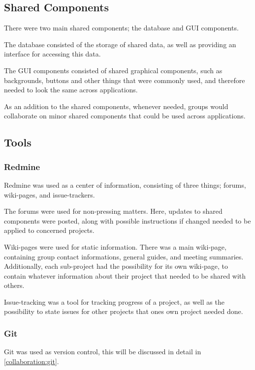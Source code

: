 \subsection{Shared Components}
There were two main shared components; the database and GUI components.

The database consisted of the storage of shared data, as well as providing an interface for accessing this data.

The GUI components consisted of shared graphical components, such as backgrounds, buttons and other things that were commonly used, and therefore needed to look the same across applications.

As an addition to the shared components, whenever needed, groups would collaborate on minor shared components that could be used across applications.

\subsection{Tools}

\subsubsection{Redmine}
Redmine was used as a center of information, consisting of three things; forums, wiki-pages, and issue-trackers.

The forums were used for non-pressing matters.
Here, updates to shared components were posted, along with possible instructions if changed needed to be applied to concerned projects.

Wiki-pages were used for static information.
There was a main wiki-page, containing group contact informations, general guides, and meeting summaries.
Additionally, each sub-project had the possibility for its own wiki-page, to contain whatever information about their project that needed to be shared with others.

Issue-tracking was a tool for tracking progress of a project, as well as the possibility to state issues for other projects that ones own project needed done.

\subsubsection{Git}
Git was used as version control, this will be discussed in detail in \ref{collaboration:git}.

